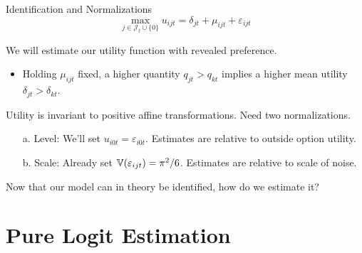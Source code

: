 \documentclass[aspectratio=169,t,11pt,table]{beamer}
\begin{document}
\begin{frame}{Identification and Normalizations}
    \vspace{-\baselineskip}
    \begin{equation*}
        \max_{j \in \mathcal{J}_t \cup \{0\}} u_{ijt} = \delta_{jt} + \mu_{ijt} + \varepsilon_{ijt}
    \end{equation*}
    \vspace{-0.5\baselineskip}
    \begin{wideitemize}
        \item We will estimate our utility function with \alert{revealed preference}.
        \begin{itemize}
            \item Holding $\mu_{ijt}$ fixed, a higher quantity $q_{jt} > q_{kt}$ implies a higher mean utility $\delta_{jt} > \delta_{kt}$.
        \end{itemize}
        \pause
        \item Utility is invariant to positive affine transformations. Need two normalizations.
        \pause
        \begin{enumerate}
            \item[a.] \alert{Level}: We'll set $u_{i0t} = \varepsilon_{i0t}$. Estimates are relative to outside option utility.
            \pause
            \item[b.] \alert{Scale}: Already set $\mathbb{V}(\varepsilon_{ijt}) = \pi^2 / 6$. Estimates are relative to scale of noise.
        \end{enumerate}
        \pause
        \item Now that our model can in theory be identified, how do we estimate it?
    \end{wideitemize}
\end{frame}

\section{Pure Logit Estimation}
\end{document}
